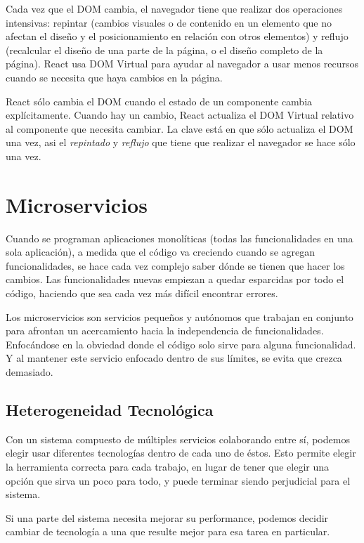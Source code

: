 Cada vez que el DOM cambia, el navegador tiene que realizar dos operaciones intensivas: repintar (cambios visuales o de contenido en un elemento que no afectan el diseño y el posicionamiento en relación con otros elementos) y reflujo (recalcular el diseño de una parte de la página, o el diseño completo de la página).
React usa DOM Virtual para ayudar al navegador a usar menos recursos cuando se necesita que haya cambios en la página.

React sólo cambia el DOM cuando el estado de un componente cambia explícitamente.
Cuando hay un cambio, React actualiza el DOM Virtual relativo al componente que necesita cambiar.
La clave está en que sólo actualiza el DOM una vez, asi el \textit{repintado} y \textit{reflujo} que tiene que realizar el navegador se hace sólo una vez.


\section[Microservicios]{Microservicios}

Cuando se programan aplicaciones monolíticas (todas las funcionalidades en una sola aplicación), a medida que el código va creciendo cuando se agregan funcionalidades, se hace cada vez complejo saber dónde se tienen que hacer los cambios.
Las funcionalidades nuevas empiezan a quedar esparcidas por todo el código, haciendo que sea cada vez más difícil encontrar errores.


Los microservicios son servicios pequeños y autónomos que trabajan en conjunto para afrontan un acercamiento hacia la independencia de funcionalidades. Enfocándose en la obviedad donde el código solo sirve para alguna funcionalidad. Y al mantener este servicio enfocado dentro de sus límites, se evita que crezca demasiado.

\subsection[Heterogeneidad Tecnológica]{Heterogeneidad Tecnológica}

Con un sistema compuesto de múltiples servicios colaborando entre sí, podemos elegir usar diferentes tecnologías dentro de cada uno de éstos. Esto permite elegir la herramienta correcta para cada trabajo, en lugar de tener que elegir una opción que sirva un poco para todo, y puede terminar siendo perjudicial para el sistema.

Si una parte del sistema necesita mejorar su performance, podemos decidir cambiar de tecnología a una que resulte mejor para esa tarea en particular.

